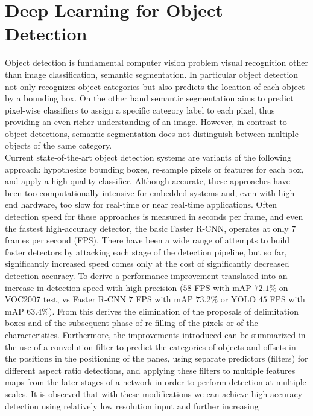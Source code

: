 \section{Deep Learning for Object Detection}
\label{sec:nn-objectdetection}
Object detection is fundamental computer vision problem visual recognition other
than image classification, semantic segmentation. 
In particular object detection not only recognizes object categories but also
predicts the location of each object by a bounding box. 
On the other hand semantic segmentation aims to predict pixel-wise classifiers
to assign a specific category label to each pixel, thus providing an even richer
understanding of an image. 
However, in contrast to object detections, semantic segmentation does not
distinguish between multiple objects of the same category.\cite{wu2020recent}\\
Current state-of-the-art object detection systems are variants of the following
approach: hypothesize bounding boxes, re-sample pixels or features for each box,
and apply a high quality classifier.
Although accurate, these approaches have been too computationally intensive for
embedded systems and, even with high-end hardware, too slow for real-time or
near real-time applications. 
Often detection speed for these approaches is measured in seconds per frame, and
even the fastest high-accuracy detector, the basic Faster R-CNN, operates at
only $7$ frames per second (FPS). 
There have been a wide range of attempts to build faster detectors by attacking
each stage of the detection pipeline, but so far, significantly increased speed
comes only at the cost of significantly decreased detection
accuracy.\cite{liu2016ssd}
To derive a performance improvement translated into an increase in detection
speed with high precision ($58$ FPS with mAP $72.1\%$ on VOC2007 test, vs Faster
R-CNN $7$ FPS with mAP $73.2\%$ or YOLO $45$ FPS with mAP $63.4\%$). 
From this derives the elimination of the proposals of delimitation boxes and of
the subsequent phase of re-filling of the pixels or of the characteristics. 
Furthermore, the improvements introduced can be summarized in the use of a
convolution filter to predict the categories of objects and offsets in the
positions in the positioning of the panes, using separate predictors (filters)
for different aspect ratio detections, and applying these filters to multiple
features maps from the later stages of a network in order to perform detection
at multiple scales.
It is observed that with these modifications we can achieve high-accuracy
detection using relatively low resolution input and further increasing
